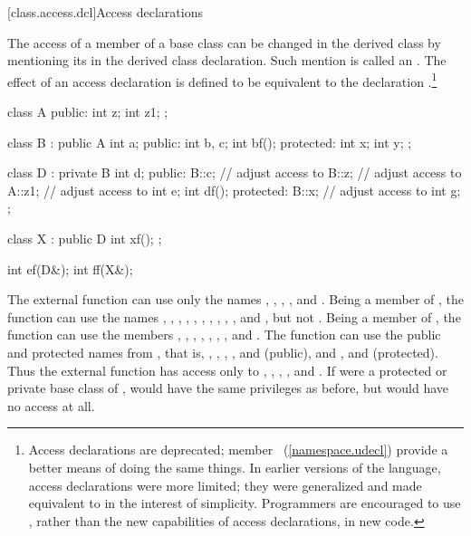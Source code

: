[class.access.dcl]{Access declarations}%

\pnum
The access of a member of a base class can be changed in the derived class
by mentioning its  in the derived class
declaration. Such mention is called an . The
effect of an access declaration  \tcode{;} is
defined to be equivalent to the declaration
  \tcode{;}.\footnote{Access
declarations are deprecated; member
~(\ref{namespace.udecl}) provide a better
means of doing the same things. In earlier versions of the \Cpp language,
access declarations were more limited; they were generalized and made
equivalent to  in the interest of
simplicity. Programmers are encouraged to use
, rather than the new capabilities of
access declarations, in new code.}

\pnum
\enterexample

\begin{codeblock}
class A {
public:
    int z;
    int z1;
};

class B : public A {
    int a;
public:
    int b, c;
    int bf();
protected:
    int x;
    int y;
};

class D : private B {
    int d;
public:
    B::c;			// adjust access to 
    B::z;			// adjust access to 
    A::z1;			// adjust access to 
    int e;
    int df();
protected:
    B::x;			// adjust access to 
    int g;
};

class X : public D {
    int xf();
};

int ef(D&);
int ff(X&);
\end{codeblock}

The external function  can use only the names , ,
, , and . Being a member of , the
function  can use the names , , ,
, , , , , , ,
and , but not . Being a member of , the function
 can use the members , , , ,
, , , and . The function 
can use the public and protected names from , that is, ,
, , , and  (public), and ,
and  (protected). Thus the external function  has access
only to , , , , and . If
 were a protected or private base class of , 
would have the same privileges as before, but  would have no
access at all.
\exitexample

